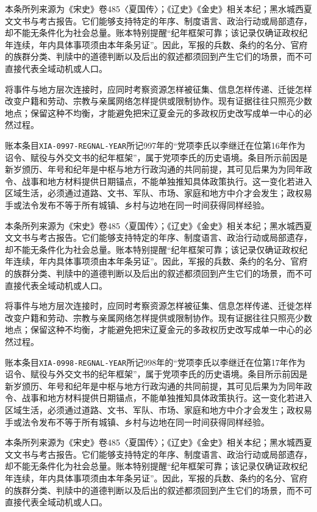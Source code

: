 本条所列来源为《宋史》卷485〈夏国传〉；《辽史》《金史》相关本纪；黑水城西夏文文书与考古报告。它们能够支持特定的年序、制度语言、政治行动或局部遗存，却不能无条件化为社会总量。账本特别提醒“纪年框架可靠；该记录仅确证政权纪年连续，年内具体事项须由本年条另证”。因此，军报的兵数、条约的名分、官府的族群分类、判牍中的道德判断以及后出的叙述都须回到产生它们的场景，而不可直接代表全域动机或人口。

将事件与地方层次连接时，应同时考察资源怎样被征集、信息怎样传递、迁徙怎样改变户籍和劳动、宗教与亲属网络怎样提供或限制协作。现有证据往往只照亮少数地点；保留这种不均衡，才能避免把宋辽夏金元的多政权历史改写成单一中心的必然过程。

账本条目\texttt{XIA-0997-REGNAL-YEAR}所记997年的“党项李氏以李继迁在位第16年作为诏令、赋役与外交文书的纪年框架”，属于党项李氏的历史语境。条目所示前因是新岁颁历、年号和纪年是中枢与地方行政沟通的共同前提，其可见后果为为同年政令、战事和地方材料提供日期锚点，不能单独推知具体政策执行。这一变化若进入区域生活，必须通过道路、文书、军队、市场、家庭和地方中介才会发生；政权易手或法令发布不等于所有城镇、乡村与边地在同一时间获得同样经验。

本条所列来源为《宋史》卷485〈夏国传〉；《辽史》《金史》相关本纪；黑水城西夏文文书与考古报告。它们能够支持特定的年序、制度语言、政治行动或局部遗存，却不能无条件化为社会总量。账本特别提醒“纪年框架可靠；该记录仅确证政权纪年连续，年内具体事项须由本年条另证”。因此，军报的兵数、条约的名分、官府的族群分类、判牍中的道德判断以及后出的叙述都须回到产生它们的场景，而不可直接代表全域动机或人口。

将事件与地方层次连接时，应同时考察资源怎样被征集、信息怎样传递、迁徙怎样改变户籍和劳动、宗教与亲属网络怎样提供或限制协作。现有证据往往只照亮少数地点；保留这种不均衡，才能避免把宋辽夏金元的多政权历史改写成单一中心的必然过程。

账本条目\texttt{XIA-0998-REGNAL-YEAR}所记998年的“党项李氏以李继迁在位第17年作为诏令、赋役与外交文书的纪年框架”，属于党项李氏的历史语境。条目所示前因是新岁颁历、年号和纪年是中枢与地方行政沟通的共同前提，其可见后果为为同年政令、战事和地方材料提供日期锚点，不能单独推知具体政策执行。这一变化若进入区域生活，必须通过道路、文书、军队、市场、家庭和地方中介才会发生；政权易手或法令发布不等于所有城镇、乡村与边地在同一时间获得同样经验。

本条所列来源为《宋史》卷485〈夏国传〉；《辽史》《金史》相关本纪；黑水城西夏文文书与考古报告。它们能够支持特定的年序、制度语言、政治行动或局部遗存，却不能无条件化为社会总量。账本特别提醒“纪年框架可靠；该记录仅确证政权纪年连续，年内具体事项须由本年条另证”。因此，军报的兵数、条约的名分、官府的族群分类、判牍中的道德判断以及后出的叙述都须回到产生它们的场景，而不可直接代表全域动机或人口。

